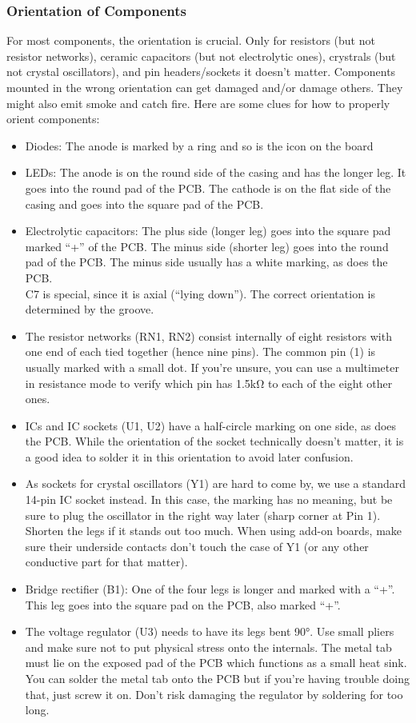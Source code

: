 \documentclass{article}
\begin{document}
\subsubsection{Orientation of Components}
For most components, the orientation is crucial. Only for resistors (but not resistor networks), ceramic capacitors (but not electrolytic ones), crystrals (but not crystal oscillators), and pin headers/sockets it doesn't matter. Components mounted in the wrong orientation can get damaged and/or damage others. They might also emit smoke and catch fire. Here are some clues for how to properly orient components:

\begin{itemize}
\item Diodes: The anode is marked by a ring and so is the icon on the board
\item LEDs: The anode is on the round side of the casing and has the longer leg. It goes into the round pad of the PCB. The cathode is on the flat side of the casing and goes into the square pad of the PCB. 
\item Electrolytic capacitors: The plus side (longer leg) goes into the square pad marked ``+'' of the PCB. The minus side (shorter leg) goes into the round pad of the PCB. The minus side usually has a white marking, as does the PCB. \\
C7 is special, since it is axial (``lying down''). The correct orientation is determined by the groove. 
\item The resistor networks (RN1, RN2) consist internally of eight resistors with one end of each tied together (hence nine pins). The common pin (1) is usually marked with a small dot. If you're unsure, you can use a multimeter in resistance mode to verify which pin has 1.5kΩ to each of the eight other ones. 
\item ICs and IC sockets (U1, U2) have a half-circle marking on one side, as does the PCB. While the orientation of the socket technically doesn't matter, it is a good idea to solder it in this orientation to avoid later confusion. 
\item As sockets for crystal oscillators (Y1) are hard to come by, we use a standard 14-pin IC socket instead. In this case, the marking has no meaning, but be sure to plug the oscillator in the right way later (sharp corner at Pin 1). \\
Shorten the legs if it stands out too much. When using add-on boards, make sure their underside contacts don't touch the case of Y1 (or any other conductive part for that matter). 
\item Bridge rectifier (B1): One of the four legs is longer and marked with a ``+''. This leg goes into the square pad on the PCB, also marked ``+''. 
\item The voltage regulator (U3) needs to have its legs bent 90°. Use small pliers and make sure not to put physical stress onto the internals. The metal tab must lie on the exposed pad of the PCB  which functions as a small heat sink. You can solder the metal tab onto the PCB but if you're having trouble doing that, just screw it on. Don't risk damaging the regulator by soldering for too long. 
\end{itemize}
\end{document}
